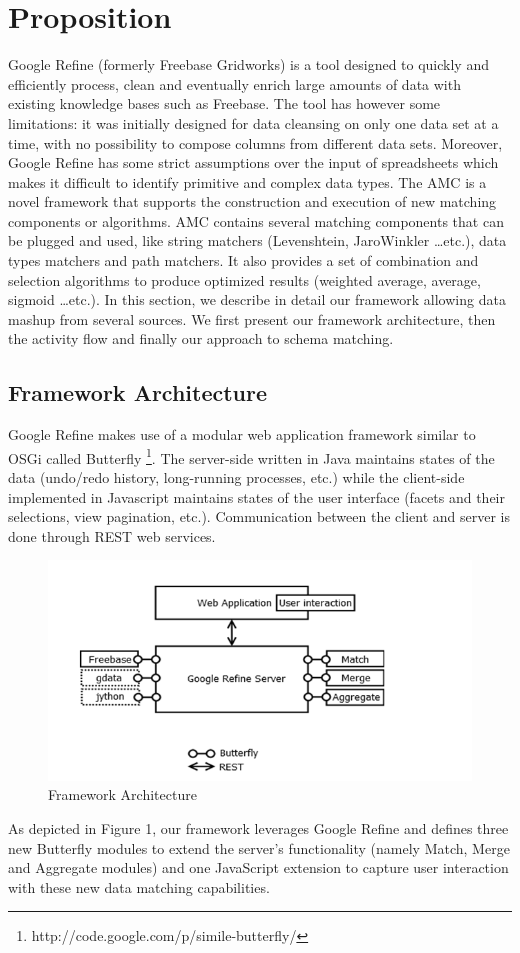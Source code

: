 \documentclass{sig-alternate}
\begin{document}
\section{Proposition}

Google Refine (formerly Freebase Gridworks) is a tool designed to quickly and efficiently process, clean and eventually enrich large amounts of data with existing knowledge bases such as Freebase. The tool has however some limitations: it was initially designed for data cleansing on only one data set at a time, with no possibility to compose columns from different data sets. Moreover, Google Refine has some strict assumptions over the input of spreadsheets which makes it difficult to identify primitive and complex data types.
The AMC is a novel framework that supports the construction and execution of new matching components or algorithms. AMC contains several matching components that can be plugged and used, like string matchers (Levenshtein, JaroWinkler \dots  etc.), data types matchers and path matchers. It also provides a set of combination and selection algorithms to produce optimized results (weighted average, average, sigmoid \dots  etc.).
In this section, we describe in detail our framework allowing data mashup from several sources. We first present our framework architecture, then the activity flow and finally our approach to schema matching.

\subsection{Framework Architecture}
Google Refine makes use of a modular web application framework similar to OSGi called Butterfly \footnote{http://code.google.com/p/simile-butterfly/}. The server-side written in Java maintains states of the data (undo/redo history, long-running processes, etc.) while the client-side implemented in Javascript maintains states of the user interface (facets and their selections, view pagination, etc.). Communication between the client and server is done through REST web services.
\begin{figure}[ht!]
  \centering
    \includegraphics[scale=0.6]{architecture-1.png}
  \caption{Framework Architecture}
\end{figure}
As depicted in Figure 1, our framework leverages Google Refine and defines three new Butterfly modules to extend the server's functionality (namely Match, Merge and Aggregate modules) and one JavaScript extension to capture user interaction with these new data matching capabilities.
\end{document}
